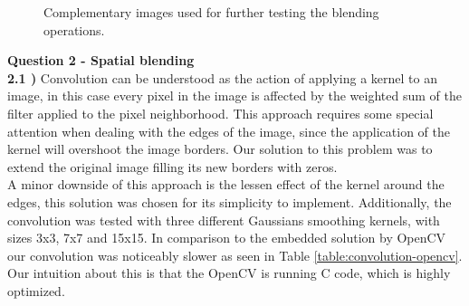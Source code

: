 \documentclass[12pt,a4paper]{article}
\begin{document}
\begin{figure}[!h]
{{		}
	}
	\quad
	\caption{Complementary images used for further testing the blending operations.}
	\label{fig:blendingFurther}
\end{figure}

\newpage

\textbf{\LARGE Question 2 - Spatial blending}\\

\textbf{2.1 )} Convolution can be understood as the action of applying a kernel to an image, in this case every pixel in the image is affected by the weighted sum of the filter applied to the pixel neighborhood. This approach requires some special attention when dealing with the edges of the image, since the application of the kernel will overshoot the image borders. Our solution to this problem was to extend the original image filling its new borders with zeros. \\

A minor downside of this approach is the lessen effect of the kernel around the edges, this solution was chosen for its simplicity to implement. Additionally, the convolution was tested with three different Gaussians smoothing kernels, with sizes 3x3, 7x7 and 15x15. In comparison to the embedded solution by OpenCV our convolution was noticeably slower as seen in Table \ref{table:convolution-opencv}. Our intuition about this is that the OpenCV is running C code, which is highly optimized. \\ 
\end{document}
